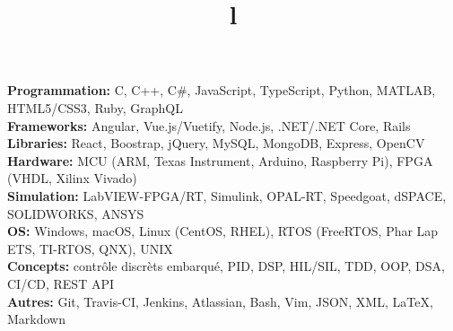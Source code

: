 \documentclass[mm]{res}
\begin{document}



\begin{resume}

\npspctoprule
\section{\headingskills}
\tb \textbf{Programmation:} C, C++, C\#, JavaScript, TypeScript, Python, MATLAB, HTML5/CSS3, Ruby, GraphQL\\
\tb \textbf{Frameworks:} Angular, Vue.js/Vuetify, Node.js, .NET/.NET Core, Rails\\
\tb \textbf{Libraries:} React, Boostrap, jQuery, MySQL, MongoDB, Express, OpenCV\\
\tb \textbf{Hardware:} MCU (ARM, Texas Instrument, Arduino, Raspberry Pi), FPGA (VHDL, Xilinx Vivado)\\
\tb \textbf{Simulation:} LabVIEW-FPGA/RT, Simulink, OPAL-RT, Speedgoat, dSPACE, SOLIDWORKS, ANSYS\\
\tb \textbf{OS:} Windows, macOS, Linux (CentOS, RHEL), RTOS (FreeRTOS, Phar Lap ETS, TI-RTOS, QNX), UNIX\\
\tb \textbf{Concepts:} contr\^ole discr\`ets embarqu\'e, PID, DSP, HIL/SIL, TDD, OOP, DSA, CI/CD, REST API\\
\tb \textbf{Autres:} Git, Travis-CI, Jenkins, Atlassian, Bash, Vim, JSON, XML, \LaTeX, Markdown

\toprule

\section{\headingeducation}
\begin{format}
\\
\title{l}\\
\end{format}


\end{resume}
\end{document}
